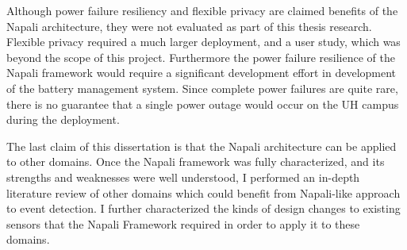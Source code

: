 Although power failure resiliency and flexible privacy are claimed benefits of the Napali architecture, they were not evaluated as part of this thesis research.
Flexible privacy required a much larger deployment, and a user study, which was beyond the scope of this project.
Furthermore the power failure resilience of the Napali framework would require a significant development effort in development of the battery management system.
Since complete power failures are quite rare, there is no guarantee that a single power outage would occur on the UH campus during the deployment.


The last claim of this dissertation is that the Napali architecture can be applied to other domains.
Once the Napali framework was fully characterized, and its strengths and weaknesses were well understood, I performed an in-depth literature review of other domains which could benefit from Napali-like approach to event detection.
I further characterized the kinds of design changes to existing sensors that the Napali Framework required in order to apply it to these domains.

